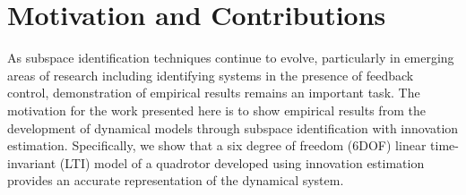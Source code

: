 \section{Motivation and Contributions}
As subspace identification techniques continue to evolve, particularly in emerging areas of research including identifying systems in the presence of feedback control, demonstration of empirical results remains an important task. The motivation for the work presented here is to show empirical results from the development of dynamical models through subspace identification with innovation estimation. Specifically, we show that a six degree of freedom (6DOF) linear time-invariant (LTI) model of a quadrotor developed using innovation estimation provides an accurate representation of the dynamical system.




